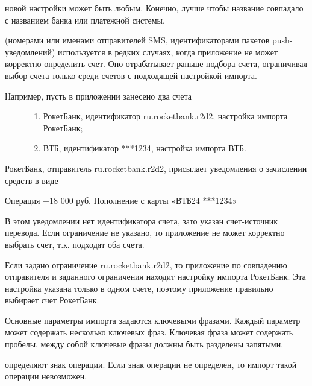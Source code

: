 \documentclass[a4paper,10pt,russian]{sphinxmanual}
\begin{document}
 новой настройки может быть любым. Конечно, лучше чтобы название совпадало с
названием банка или платежной системы.

 (номерами или именами отправителей SMS, идентификаторами пакетов push-уведомлений)
используется в редких случаях, когда приложение не может корректно определить счет. Оно отрабатывает раньше
подбора счета, ограничивая выбор счета только среди счетов с подходящей настройкой импорта.
\begin{description}
\item[{Например, пусть в приложении занесено два счета}] \leavevmode\begin{enumerate}
\def\theenumi{\arabic{enumi}}
\def\labelenumi{\theenumi .}
\makeatletter\def\p@enumii{\p@enumi \theenumi .}\makeatother
\item {} 
РокетБанк, идентификатор ru.rocketbank.r2d2, настройка импорта РокетБанк;

\item {} 
ВТБ, идентификатор ***1234, настройка импорта ВТБ.

\end{enumerate}

\end{description}

РокетБанк, отправитель ru.rocketbank.r2d2, присылает уведомления о зачислении средств в виде

\begin{sphinxVerbatim}[commandchars=\\\{\}]
Операция \PYGZgt{}\PYGZgt{} +18 000 руб.
Пополнение с карты «ВТБ\PYGZhy{}24 ***1234»
\end{sphinxVerbatim}

В этом уведомлении нет идентификатора счета, зато указан счет-источник перевода. Если ограничение не указано,
то приложение не может корректно выбрать счет, т.к. подходят оба счета.

Если задано ограничение ru.rocketbank.r2d2, то приложение по совпадению отправителя и заданного ограничения
находит настройку импорта РокетБанк. Эта настройка указана только в одном счете, поэтому приложение правильно выбирает
счет РокетБанк.

Основные параметры импорта задаются ключевыми фразами. Каждый параметр может содержать несколько ключевых фраз.
Ключевая фраза может содержать пробелы, между собой ключевые фразы должны быть разделены запятыми.

 определяют знак операции. Если знак операции не определен, то импорт такой операции невозможен.
\end{document}
